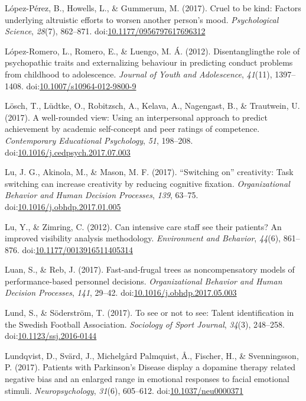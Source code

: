 \documentclass[english,man]{apa6}
\theoremstyle{definition}
\theoremstyle{definition}
\theoremstyle{definition}
\theoremstyle{remark}
\begin{document}
\hypertarget{ref-Lopez-Perez2017}{}
López-Pérez, B., Howells, L., \& Gummerum, M. (2017). Cruel to be kind:
Factors underlying altruistic efforts to worsen another person's mood.
\emph{Psychological Science}, \emph{28}(7), 862--871.
doi:\href{https://doi.org/10.1177/0956797617696312}{10.1177/0956797617696312}

\hypertarget{ref-Lopez-Romero2012}{}
López-Romero, L., Romero, E., \& Luengo, M. Á. (2012). Disentanglingthe
role of psychopathic traits and externalizing behaviour in predicting
conduct problems from childhood to adolescence. \emph{Journal of Youth
and Adolescence}, \emph{41}(11), 1397--1408.
doi:\href{https://doi.org/10.1007/s10964-012-9800-9}{10.1007/s10964-012-9800-9}

\hypertarget{ref-Losch2017}{}
Lösch, T., Lüdtke, O., Robitzsch, A., Kelava, A., Nagengast, B., \&
Trautwein, U. (2017). A well-rounded view: Using an interpersonal
approach to predict achievement by academic self-concept and peer
ratings of competence. \emph{Contemporary Educational Psychology},
\emph{51}, 198--208.
doi:\href{https://doi.org/10.1016/j.cedpsych.2017.07.003}{10.1016/j.cedpsych.2017.07.003}

\hypertarget{ref-Lu2017}{}
Lu, J. G., Akinola, M., \& Mason, M. F. (2017). ``Switching on''
creativity: Task switching can increase creativity by reducing cognitive
fixation. \emph{Organizational Behavior and Human Decision Processes},
\emph{139}, 63--75.
doi:\href{https://doi.org/10.1016/j.obhdp.2017.01.005}{10.1016/j.obhdp.2017.01.005}

\hypertarget{ref-Lu2012}{}
Lu, Y., \& Zimring, C. (2012). Can intensive care staff see their
patients? An improved visibility analysis methodology. \emph{Environment
and Behavior}, \emph{44}(6), 861--876.
doi:\href{https://doi.org/10.1177/0013916511405314}{10.1177/0013916511405314}

\hypertarget{ref-Luan2017}{}
Luan, S., \& Reb, J. (2017). Fast-and-frugal trees as noncompensatory
models of performance-based personnel decisions. \emph{Organizational
Behavior and Human Decision Processes}, \emph{141}, 29--42.
doi:\href{https://doi.org/10.1016/j.obhdp.2017.05.003}{10.1016/j.obhdp.2017.05.003}

\hypertarget{ref-Lund2017}{}
Lund, S., \& Söderström, T. (2017). To see or not to see: Talent
identification in the Swedish Football Association. \emph{Sociology of
Sport Journal}, \emph{34}(3), 248--258.
doi:\href{https://doi.org/10.1123/ssj.2016-0144}{10.1123/ssj.2016-0144}

\hypertarget{ref-Lundqvist2017}{}
Lundqvist, D., Svärd, J., Michelgård Palmquist, Å., Fischer, H., \&
Svenningsson, P. (2017). Patients with Parkinson's Disease display a
dopamine therapy related negative bias and an enlarged range in
emotional responses to facial emotional stimuli. \emph{Neuropsychology},
\emph{31}(6), 605--612.
doi:\href{https://doi.org/10.1037/neu0000371}{10.1037/neu0000371}
\end{document}
